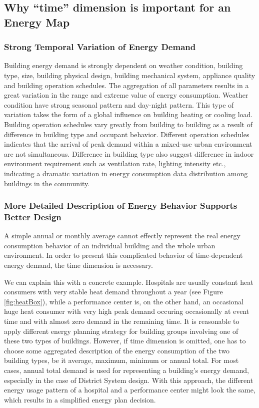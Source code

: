 \documentclass[hidelinks,12pt]{article}
\newcommand{\fref}[1]{Figure \ref{#1}}
\begin{document}
\subsection{Why ``time'' dimension is important for an Energy Map}
\subsubsection{Strong Temporal Variation of Energy Demand}
Building energy demand is strongly dependent on weather condition,
building type, size, building physical design, building mechanical
system, appliance quality and building operation schedules.  The
aggregation of all parameters results in a great variation in the
range and extreme value of energy consumption. Weather condition have
strong seasonal pattern and day-night pattern. This type of variation
takes the form of a global influence on building heating or cooling
load. Building operation schedules vary greatly from building to
building as a result of difference in building type and occupant
behavior. Different operation schedules indicates that the arrival of
peak demand within a mixed-use urban environment are not
simultaneous. Difference in building type also suggest difference in
indoor environment requirement such as ventilation rate, lighting
intensity etc., indicating a dramatic variation in energy consumption
data distribution among buildings in the community.

\subsubsection{More Detailed Description of Energy Behavior Supports
  Better Design}
A simple annual or monthly average cannot effectly represent the real
energy consumption behavior of an individual building and the whole
urban environment. In order to present this complicated behavior of
time-dependent energy demand, the time dimension is necessary.

We can explain this with a concrete example. Hospitals are usually
constant heat consumers with very stable heat demand throughout a year
(see \fref{fig:heatBox}), while a performance center is, on the other
hand, an occasional huge heat consumer with very high peak demand
occuring occasionally at event time and with almost zero demand in the
remaining time. It is reasonable to apply different energy planning
strategy for building groups involving one of these two types of
buildings. However, if time dimension is omitted, one has to choose
some aggregated description of the energy consumption of the two
building types, be it average, maximum, minimum or annual total. For
most cases, annual total demand is used for representing a building's
energy demand, especially in the case of District System design. With
this approach, the different energy usage pattern of a hospital and a
performance center might look the same, which results in a simplified
energy plan decision.
\end{document}
